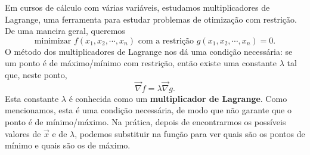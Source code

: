 \begin{obs}[Opcional]
	Em cursos de cálculo com várias variáveis, estudamos multiplicadores de Lagrange, uma ferramenta para estudar problemas de otimização com restrição. De uma maneira geral, queremos
	\begin{equation}
	\text{minimizar } f(x_1, x_2, \cdots, x_n) \text{ com a restrição } g(x_1, x_2, \cdots, x_n) = 0.
	\end{equation} O método dos multiplicadores de Lagrange nos dá uma condição necessária: se um ponto é de máximo/mínimo com restrição, então existe uma constante $\lambda$ tal que, neste ponto,
	\begin{equation}
	\vec{\nabla} f = \lambda \vec{\nabla} g.
	\end{equation} Esta constante $\lambda$ é conhecida como um \textbf{multiplicador de Lagrange}. Como mencionamos, esta é uma condição necessária, de modo que não garante que o ponto é de mínimo/máximo. Na prática, depois de encontrarmos os possíveis valores de $\vec{x}$ e de $\lambda$, podemos substituir na função para ver quais são os pontos de mínimo e quais são os de máximo.


\end{obs}
